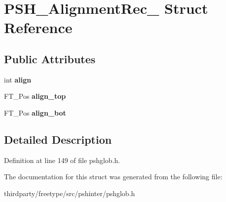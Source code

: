 \hypertarget{struct_p_s_h___alignment_rec__}{}\section{P\+S\+H\+\_\+\+Alignment\+Rec\+\_\+ Struct Reference}
\label{struct_p_s_h___alignment_rec__}
\subsection*{Public Attributes}
\begin{DoxyCompactItemize}
\item 
\mbox{\label{struct_p_s_h___alignment_rec___ae3e8c38c467a36922be68acdfc5e0f83}} 
int {\bfseries align}
\item 
\mbox{\label{struct_p_s_h___alignment_rec___aa1138ec07d93acff80b1edd7be62ba44}} 
F\+T\+\_\+\+Pos {\bfseries align\+\_\+top}
\item 
\mbox{\label{struct_p_s_h___alignment_rec___ab6bfd035d92fb362085832c1e4a5e2f0}} 
F\+T\+\_\+\+Pos {\bfseries align\+\_\+bot}
\end{DoxyCompactItemize}


\subsection{Detailed Description}


Definition at line 149 of file pshglob.\+h.



The documentation for this struct was generated from the following file\+:\begin{DoxyCompactItemize}
\item 
thirdparty/freetype/src/pshinter/pshglob.\+h\end{DoxyCompactItemize}
